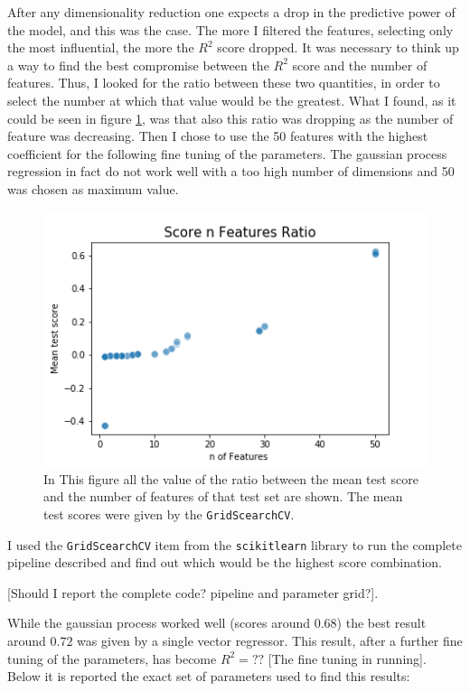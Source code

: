 \documentclass[11pt,a4paper]{report}
\begin{document}
After any dimensionality reduction one expects a drop in the predictive power of the model, and this was the case. The more I filtered the features, selecting only the most influential, the more the $R^{2}$ score dropped. It was necessary to think up a way to find the best compromise between the $R^{2}$ score and the number of features. Thus, I looked for the ratio between these two quantities, in order to select the number at which that value would be the greatest. What I found, as it could be seen in figure \ref{fig:Score_Features_Ratio}, was that also this ratio was dropping as the number of feature was decreasing. Then I chose to use the 50 features with the highest coefficient for the following fine tuning of the parameters. The gaussian process regression in fact do not work well with a too high number of dimensions and 50 was chosen as maximum value.


\begin{figure}[ht!]
  \begin{center}
  \includegraphics[width=0.7\linewidth]{Score_Features_Ratio.png}
  \caption{\small{In This figure all the value of the ratio between the mean test score and the number of features of that test set are shown. The mean test scores were given by the \texttt{GridScearchCV}. }}
  \label{fig:Score_Features_Ratio}
  \end{center}
\end{figure}


 I used the \texttt{GridScearchCV} item from the \texttt{scikitlearn} library to run the complete pipeline described and find out which would be the highest score combination.

 [Should I report the complete code? pipeline and parameter grid?].

While the gaussian process worked well (scores around 0.68) the best result around $0.72$ was given by a single vector regressor. This result, after a further fine tuning of the parameters, has become $R^{2} = ??$ [The fine tuning in running]. Below it is reported the exact set of parameters used to find this results:
\end{document}
